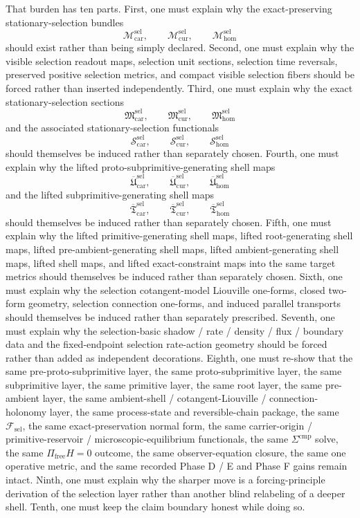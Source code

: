 \documentclass[11pt]{article}
\newcommand{\StemFunctional}{\mathscr F_{\mathrm{sel}}}
\newcommand{\Car}{\mathrm{car}}
\newcommand{\Cur}{\mathrm{cur}}
\newcommand{\Hom}{\mathrm{hom}}
\newcommand{\SelSpace}[1]{\mathcal M_{#1}^{\mathrm{sel}}}
\newcommand{\SelSection}[1]{\mathfrak M_{#1}^{\mathrm{sel}}}
\newcommand{\SelFunctional}[1]{\mathscr S_{#1}^{\mathrm{sel}}}
\newcommand{\SelLiftedPreProto}[1]{\overline{\mathfrak U}_{#1}^{\mathrm{sel}}}
\newcommand{\SelLiftedSubprimitive}[1]{\overline{\mathfrak T}_{#1}^{\mathrm{sel}}}
\begin{document}
That burden has ten parts. First, one must explain why the exact-preserving stationary-selection bundles
\[
\SelSpace{\Car},\qquad
\SelSpace{\Cur},\qquad
\SelSpace{\Hom}
\]
should exist rather than being simply declared. Second, one must explain why the visible selection readout maps, selection unit sections, selection time reversals, preserved positive selection metrics, and compact visible selection fibers should be forced rather than inserted independently. Third, one must explain why the exact stationary-selection sections
\[
\SelSection{\Car},\qquad
\SelSection{\Cur},\qquad
\SelSection{\Hom}
\]
and the associated stationary-selection functionals
\[
\SelFunctional{\Car},\qquad
\SelFunctional{\Cur},\qquad
\SelFunctional{\Hom}
\]
should themselves be induced rather than separately chosen. Fourth, one must explain why the lifted proto-subprimitive-generating shell maps
\[
\SelLiftedPreProto{\Car},\qquad
\SelLiftedPreProto{\Cur},\qquad
\SelLiftedPreProto{\Hom}
\]
and the lifted subprimitive-generating shell maps
\[
\SelLiftedSubprimitive{\Car},\qquad
\SelLiftedSubprimitive{\Cur},\qquad
\SelLiftedSubprimitive{\Hom}
\]
should themselves be induced rather than separately chosen. Fifth, one must explain why the lifted primitive-generating shell maps, lifted root-generating shell maps, lifted pre-ambient-generating shell maps, lifted ambient-generating shell maps, lifted shell maps, and lifted exact-constraint maps into the same target metrics should themselves be induced rather than separately chosen. Sixth, one must explain why the selection cotangent-model Liouville one-forms, closed two-form geometry, selection connection one-forms, and induced parallel transports should themselves be induced rather than separately prescribed. Seventh, one must explain why the selection-basic shadow / rate / density / flux / boundary data and the fixed-endpoint selection rate-action geometry should be forced rather than added as independent decorations. Eighth, one must re-show that the same pre-proto-subprimitive layer, the same proto-subprimitive layer, the same subprimitive layer, the same primitive layer, the same root layer, the same pre-ambient layer, the same ambient-shell / cotangent-Liouville / connection-holonomy layer, the same process-state and reversible-chain package, the same \(\StemFunctional\), the same exact-preservation normal form, the same carrier-origin / primitive-reservoir / microscopic-equilibrium functionals, the same \(\Sigma^{\mathrm{cmp}}\) solve, the same \(\Pi_{\mathrm{free}}H=0\) outcome, the same observer-equation closure, the same one operative metric, and the same recorded Phase D / E and Phase F gains remain intact. Ninth, one must explain why the sharper move is a forcing-principle derivation of the selection layer rather than another blind relabeling of a deeper shell. Tenth, one must keep the claim boundary honest while doing so.
\end{document}
